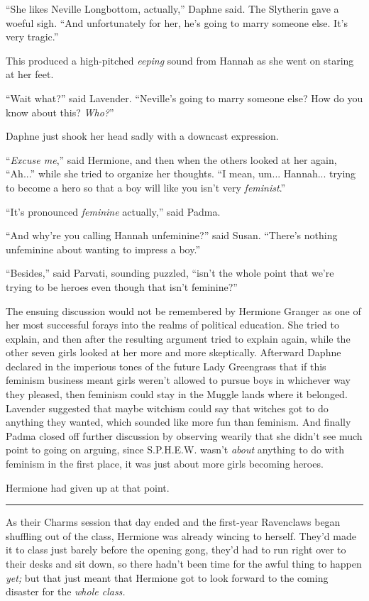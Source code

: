 ``She likes Neville Longbottom, actually,'' Daphne said. The Slytherin gave a woeful sigh. ``And unfortunately for her, he's going to marry someone else. It's very tragic.''

This produced a high-pitched \emph{eeping} sound from Hannah as she went on staring at her feet.

``Wait what?'' said Lavender. ``Neville's going to marry someone else? How do you know about this? \emph{Who?}''

Daphne just shook her head sadly with a downcast expression.

``\emph{Excuse me},'' said Hermione, and then when the others looked at her again, ``Ah...'' while she tried to organize her thoughts. ``I mean, um... Hannah... trying to become a hero so that a boy will like you isn't very \emph{feminist}.''

``It's pronounced \emph{feminine} actually,'' said Padma.

``And why're you calling Hannah unfeminine?'' said Susan. ``There's nothing unfeminine about wanting to impress a boy.''

``Besides,'' said Parvati, sounding puzzled, ``isn't the whole point that we're trying to be heroes even though that isn't feminine?''

The ensuing discussion would not be remembered by Hermione Granger as one of her most successful forays into the realms of political education. She tried to explain, and then after the resulting argument tried to explain again, while the other seven girls looked at her more and more skeptically. Afterward Daphne declared in the imperious tones of the future Lady Greengrass that if this feminism business meant girls weren't allowed to pursue boys in whichever way they pleased, then feminism could stay in the Muggle lands where it belonged. Lavender suggested that maybe witchism could say that witches got to do anything they wanted, which sounded like more fun than feminism. And finally Padma closed off further discussion by observing wearily that she didn't see much point to going on arguing, since S.P.H.E.W. wasn't \emph{about} anything to do with feminism in the first place, it was just about more girls becoming heroes.

Hermione had given up at that point.

\begin{center}\rule{3in}{0.4pt}\end{center}

As their Charms session that day ended and the first-year Ravenclaws began shuffling out of the class, Hermione was already wincing to herself. They'd made it to class just barely before the opening gong, they'd had to run right over to their desks and sit down, so there hadn't been time for the awful thing to happen \emph{yet;} but that just meant that Hermione got to look forward to the coming disaster for the \emph{whole class.}

